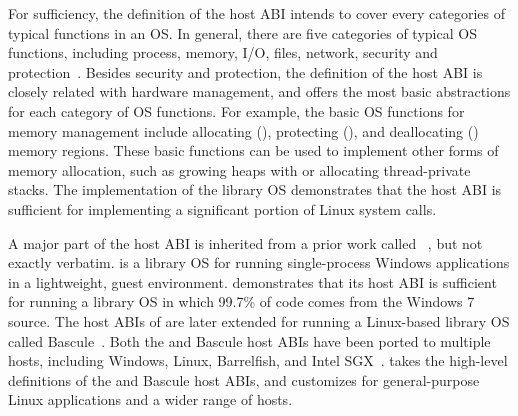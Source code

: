 For sufficiency, the definition of the host ABI
intends to cover every categories of typical functions in an OS.
In general, there are five categories of typical OS functions,
including
process, memory, I/O, files, network, security and protection~\cite{dhamdhere2007os-textbook}.
Besides security and protection,
the definition of the host ABI is closely related with hardware management,
and offers the most basic abstractions for each category of OS functions.
For example, the basic OS functions for memory management include
allocating (),
protecting (),
and deallocating () memory regions. %
These basic functions can be used to implement other forms of memory allocation,
such as growing heaps with 
or allocating thread-private stacks.
The implementation of the \graphene{} library OS demonstrates that
the host ABI is sufficient for implementing a significant portion of Linux system calls.

A major part of 
the host ABI is inherited from a prior work called \drawbridge{}~\cite{porter11drawbridge}, but not exactly verbatim.
\drawbridge{} is a library OS for running single-process Windows applications
in a lightweight, guest environment.
\drawbridge{} demonstrates that its host ABI is sufficient
for running a library OS in which 99.7\% of code comes from the Windows 7 source.
The host ABIs of \drawbridge{} are later extended
for running a Linux-based library OS called Bascule~\cite{baumann13bascule}.
Both the \drawbridge{} and Bascule host ABIs have been
ported to multiple hosts, including Windows, Linux, Barrelfish, and Intel SGX~\cite{porter11drawbridge,baumann14haven,mssql-on-linux,baumann13bascule}.
\graphene{} takes the high-level definitions of the \drawbridge{} and Bascule host ABIs, and customizes for general-purpose Linux applications and a wider range of hosts. 




